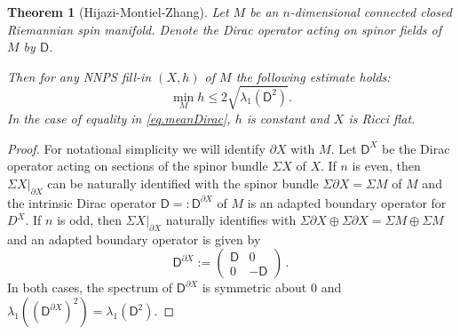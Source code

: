 \documentclass[11pt,reqno]{amsart}
\newcommand{\dX}{{\partial X}}
\newcommand{\D}{\mathsf{D}}
\newcommand{\<}{\langle}
\renewcommand{\>}{\rangle}
\newtheorem{theorem}{Theorem}
\theoremstyle{definition}
\begin{document}
\begin{theorem}[Hijazi-Montiel-Zhang]\label{thm.HMZ}
Let $M$ be an $n$-dimensional connected closed Riemannian spin manifold.
Denote the Dirac operator acting on spinor fields of $M$ by $\D$.

Then for any NNPS fill-in $(X,h)$ of $M$ the following estimate holds:
\begin{equation}
\min_M h \le 2\sqrt{\lambda_1(\D^2)}.
\label{eq.meanDirac}
\end{equation}
In the case of equality in \eqref{eq.meanDirac}, $h$ is constant and $X$ is Ricci flat.
\end{theorem}

\begin{proof}
For notational simplicity we will identify $\dX$ with $M$.
Let $\D^X$ be the Dirac operator acting on sections of the spinor bundle $\Sigma X$ of $X$.
If $n$ is even, then $\Sigma X|_\dX$ can be naturally identified with the spinor bundle $\Sigma\dX=\Sigma M$ of $M$ and the intrinsic Dirac operator $\D=:\D^\dX$ of $M$ is an adapted boundary operator for $D^X$.
If $n$ is odd, then $\Sigma X|_\dX$ naturally identifies with $\Sigma\dX\oplus \Sigma\dX=\Sigma M\oplus \Sigma M$ and an adapted boundary operator is given by 
$$
\D^\dX :=
\begin{pmatrix}
\D & 0\\
0 & -\D
\end{pmatrix} \, .
$$
In both cases, the spectrum of $\D^\dX$ is symmetric about $0$ and $\lambda_1((\D^\dX)^2)=\lambda_1(\D^2)$.


\end{proof}
\end{document}
